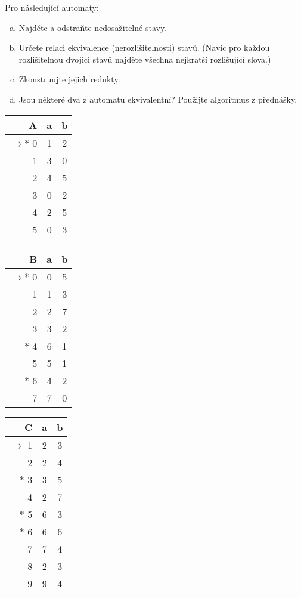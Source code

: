\documentclass[a4paper,12pt]{amsart}
\begin{document}
\vspace{-12pt}

\medskip\begin{problem}    
    
    Pro následující automaty:

    \begin{enumerate}[(a)]\setlength\itemsep{6pt}
        \item Najděte a odstraňte nedosažitelné stavy.
        \item Určete relaci ekvivalence (nerozlišitelnosti) stavů. (Navíc pro každou rozlišitelnou dvojici stavů najděte všechna nejkratší rozlišující slova.)
        \item Zkonstruujte jejich redukty.
        \item Jsou některé dva z automatů ekvivalentní? Použijte algoritmus z přednášky.
    \end{enumerate}
    
    \begin{multicols}{3}\small\centering
    
        \begin{tabular}{ r | c c }
            A & a & b \\ \hline
            $\to\ast$ 0 & 1 & 2 \\  
            1 & 3 & 0 \\
            2 & 4 & 5 \\
            3 & 0 & 2 \\
            4 & 2 & 5 \\
            5 & 0 & 3
        \end{tabular}
            
        \begin{tabular}{ r | c c }
            B & a & b \\ \hline
            $\to\ast$ 0 & 0 & 5 \\  
            1 & 1 & 3 \\
            2 & 2 & 7 \\
            3 & 3 & 2 \\
            $\ast$ 4 & 6 & 1 \\
            5 & 5 & 1 \\
            $\ast$ 6 & 4 & 2 \\
            7 & 7 & 0
        \end{tabular}
                
        \begin{tabular}{ r | c c }
            C & a & b \\ \hline
            $\to$ 1 & 2 & 3 \\
            2 & 2 & 4 \\
            $\ast$ 3 & 3 & 5 \\
            4 & 2 & 7 \\
            $\ast$ 5 & 6 & 3 \\
            $\ast$ 6 & 6 & 6 \\
            7 & 7 & 4 \\
            8 & 2 & 3 \\
            9 & 9 & 4
        \end{tabular}


\end{multicols}
\end{problem}
\end{document}
